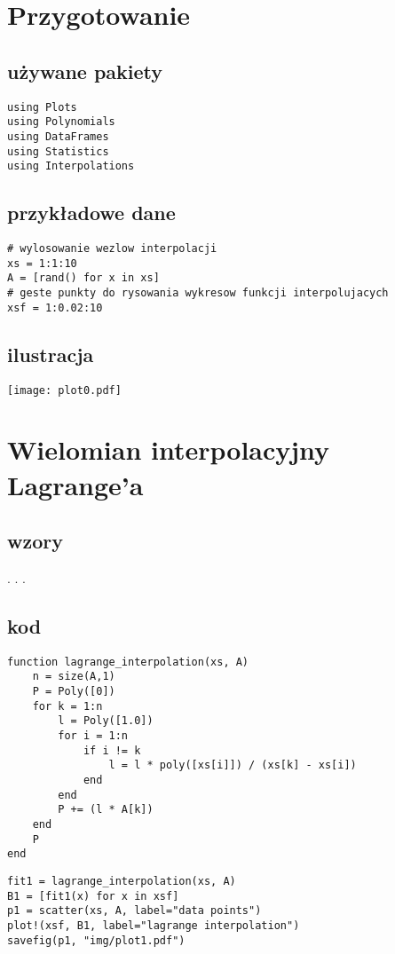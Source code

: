 





\section{\bf Przygotowanie}

\subsection{\bf używane pakiety}
\begin{lstlisting}
using Plots
using Polynomials
using DataFrames
using Statistics
using Interpolations
\end{lstlisting}

\subsection{\bf przykładowe dane}
\begin{lstlisting}
# wylosowanie wezlow interpolacji
xs = 1:1:10
A = [rand() for x in xs]
# geste punkty do rysowania wykresow funkcji interpolujacych
xsf = 1:0.02:10
\end{lstlisting}

\subsection{\bf ilustracja}
\begin{center}
    \texttt{[image: plot0.pdf]}
\end{center}
\clearpage
\section{\bf Wielomian interpolacyjny Lagrange’a}

\subsection{\bf wzory}
    . . .

\subsection{\bf kod}
\begin{lstlisting}
function lagrange_interpolation(xs, A)   
    n = size(A,1)
    P = Poly([0])
    for k = 1:n
        l = Poly([1.0])
        for i = 1:n
            if i != k
                l = l * poly([xs[i]]) / (xs[k] - xs[i])
            end
        end            
        P += (l * A[k])
    end
    P
end
\end{lstlisting}
\begin{lstlisting}
fit1 = lagrange_interpolation(xs, A)
B1 = [fit1(x) for x in xsf]
p1 = scatter(xs, A, label="data points")
plot!(xsf, B1, label="lagrange interpolation")
savefig(p1, "img/plot1.pdf")
\end{lstlisting}

